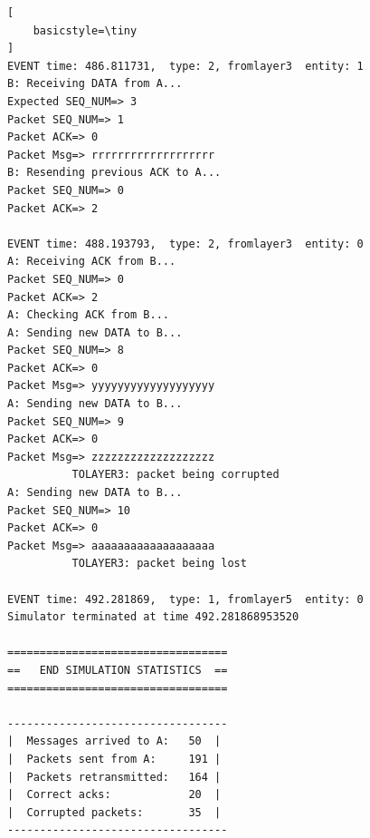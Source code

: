 \documentclass[a4paperr]{article}
\begin{document}
\begin{lstlisting}[
    basicstyle=\tiny
]
EVENT time: 486.811731,  type: 2, fromlayer3  entity: 1
B: Receiving DATA from A...
Expected SEQ_NUM=> 3
Packet SEQ_NUM=> 1
Packet ACK=> 0
Packet Msg=> rrrrrrrrrrrrrrrrrrr
B: Resending previous ACK to A...
Packet SEQ_NUM=> 0
Packet ACK=> 2

EVENT time: 488.193793,  type: 2, fromlayer3  entity: 0
A: Receiving ACK from B...
Packet SEQ_NUM=> 0
Packet ACK=> 2
A: Checking ACK from B...
A: Sending new DATA to B...
Packet SEQ_NUM=> 8
Packet ACK=> 0
Packet Msg=> yyyyyyyyyyyyyyyyyyy
A: Sending new DATA to B...
Packet SEQ_NUM=> 9
Packet ACK=> 0
Packet Msg=> zzzzzzzzzzzzzzzzzzz
          TOLAYER3: packet being corrupted
A: Sending new DATA to B...
Packet SEQ_NUM=> 10
Packet ACK=> 0
Packet Msg=> aaaaaaaaaaaaaaaaaaa
          TOLAYER3: packet being lost

EVENT time: 492.281869,  type: 1, fromlayer5  entity: 0
Simulator terminated at time 492.281868953520
 
==================================
==   END SIMULATION STATISTICS  ==
==================================
 
----------------------------------
|  Messages arrived to A:   50  |
|  Packets sent from A:     191 |
|  Packets retransmitted:   164 |
|  Correct acks:            20  |
|  Corrupted packets:       35  |
----------------------------------
\end{lstlisting}
\end{document}
